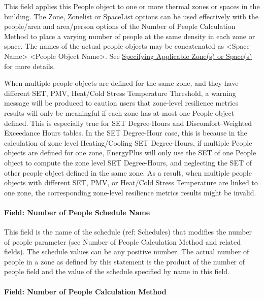 This field applies this People object to one or more thermal zones or spaces in the building. The Zone, Zonelist or SpaceList options can be used effectively with the people/area and area/person options of the Number of People Calculation Method to place a varying number of people at the same density in each zone or space. The names of the actual people objects may be concatenated as \textless{}Space Name\textgreater{} \textless{}People Object Name\textgreater{}. See \hyperref[specifying-applicable-zones-or-spaces]{Specifying Applicable Zone(s) or Space(s)} for more details.

When multiple people objects are defined for the same zone, and they have different SET, PMV, Heat/Cold Stress Temperature Threshold, a warning message will be produced to caution users that zone-level resilience metrics results will only be meaningful if each zone has at most one People object defined. This is especially true for SET Degree-Hours and Discomfort-Weighted Exceedance Hours tables. In the SET Degree-Hour case, this is because in the calculation of zone level Heating/Cooling SET Degree-Hours, if multiple People objects are defined for one zone, EnergyPlus will only use the SET of one People object to compute the zone level SET Degree-Hours, and neglecting the SET of other people object defined in the same zone. As a result, when multiple people objects with different SET, PMV, or Heat/Cold Stress Temperature are linked to one zone, the corresponding zone-level resilience metrics results might be invalid.

\paragraph{Field: Number of People Schedule Name}\label{field-number-of-people-schedule-name}

This field is the name of the schedule (ref: Schedules) that modifies the number of people parameter (see Number of People Calculation Method and related fields). The schedule values can be any positive number. The actual number of people in a zone as defined by this statement is the product of the number of people field and the value of the schedule specified by name in this field.

\paragraph{Field: Number of People Calculation Method}\label{field-number-of-people-calculation-method}

